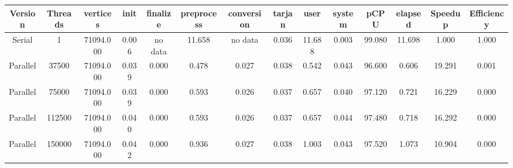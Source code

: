 \begin{tabular}{|c|c|c|c|c|c|c|c|c|c|c|c|c|c|}
\toprule
 Version &  Threads &   vertices &  init & finalize &  preprocess & conversion &  tarjan &   user &  system &   pCPU &  elapsed &  Speedup &  Efficiency \\
\midrule
  Serial &        1 &  71094.000 & 0.006 &  no data &      11.658 &    no data &   0.036 & 11.688 &   0.003 & 99.080 &   11.698 &    1.000 &       1.000 \\
Parallel &    37500 &  71094.000 & 0.039 &    0.000 &       0.478 &      0.027 &   0.038 &  0.542 &   0.043 & 96.600 &    0.606 &   19.291 &       0.001 \\
Parallel &    75000 &  71094.000 & 0.039 &    0.000 &       0.593 &      0.026 &   0.037 &  0.657 &   0.040 & 97.120 &    0.721 &   16.229 &       0.000 \\
Parallel &   112500 &  71094.000 & 0.040 &    0.000 &       0.593 &      0.026 &   0.037 &  0.657 &   0.044 & 97.480 &    0.718 &   16.292 &       0.000 \\
Parallel &   150000 &  71094.000 & 0.042 &    0.000 &       0.936 &      0.027 &   0.038 &  1.003 &   0.043 & 97.520 &    1.073 &   10.904 &       0.000 \\
\bottomrule
\end{tabular}
